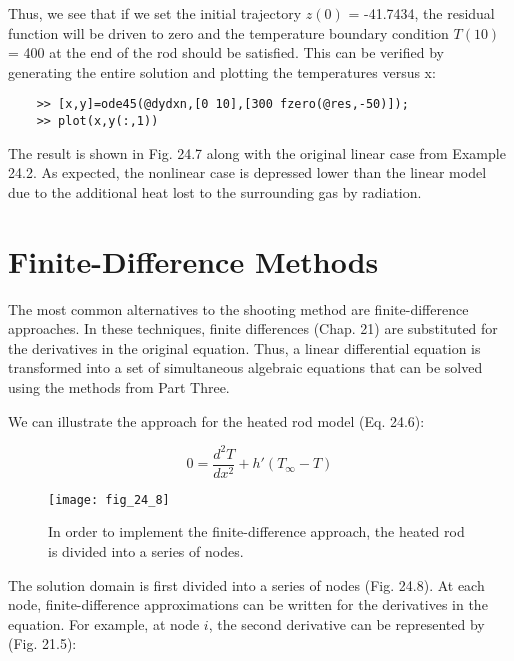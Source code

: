 \documentclass[../main.tex]{subfiles}
\begin{document}
\begin{exmp}
    \noindent Thus, we see that if we set the initial trajectory $z(0)$ = -41.7434, the residual function will
    be driven to zero and the temperature boundary condition $T(10)$ = 400 at the end of the
    rod should be satisfied. This can be verified by generating the entire solution and plotting
    the temperatures versus x:\vspace*{\smallskipamount}
    \begin{lstlisting}
    >> [x,y]=ode45(@dydxn,[0 10],[300 fzero(@res,-50)]);
    >> plot(x,y(:,1))
    \end{lstlisting}

    The result is shown in Fig. 24.7 along with the original linear case from Example 24.2.
    As expected, the nonlinear case is depressed lower than the linear model due to the additional heat lost to the surrounding gas by radiation.
\end{exmp}\vspace{2cm}

\section{Finite-Difference Methods}
\noindent The most common alternatives to the shooting method are finite-difference approaches. In
these techniques, finite differences (Chap. 21) are substituted for the derivatives in the
original equation. Thus, a linear differential equation is transformed into a set of simultaneous algebraic equations that can be solved using the methods from Part Three.

We can illustrate the approach for the heated rod model (Eq. 24.6):

\begin{equation}
    \tag{24.14}
    0=\frac{d^2T}{dx^2}+h'(T_\infty-T)
\end{equation}

\begin{figure}[H]
    \centering
    \texttt{[image: fig\_24\_8]}
   \caption{\textsf{In order to implement the finite-difference approach, the heated rod is divided into a series of
   nodes.}}\label{fig:fig_24_8}
\end{figure}

\noindent The solution domain is first divided into a series of nodes (Fig. 24.8). At each node, finite-difference approximations can be written for the derivatives in the equation. For example, at node $i$, the second derivative can be represented by (Fig. 21.5):
\end{document}
